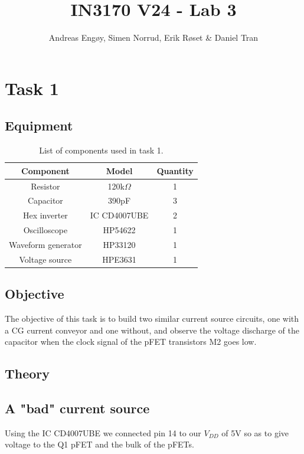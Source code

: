 \documentclass[onecolumn]{article}
\title{IN3170 V24 - Lab 3}
\author{Andreas Engøy, Simen Norrud, Erik Røset \& Daniel Tran}
\date{\monthname[\the\month] \the\year}
\begin{document}
\maketitle


\section{Task 1}
\subsection{Equipment}
\begin{table}[h]
    \centering
    \begin{tabular}{|c|c|c|}
        \hline
        \textbf{Component} & \textbf{Model} & \textbf{Quantity} \\
        \hline
        Resistor & 120k$\Omega$ & 1 \\
        Capacitor & 390pF & 3 \\
        Hex inverter & IC CD4007UBE & 2 \\
        Oscilloscope & HP54622 & 1 \\
        Waveform generator  & HP33120 & 1\\
        Voltage source & HPE3631 & 1 \\
        \hline
    \end{tabular}
    \caption{List of components used in task 1.}
    \label{tab:bom}
\end{table}

\subsection{Objective}
The objective of this task is to build two similar current source circuits, one with a CG current conveyor and one without, and observe the voltage discharge of the capacitor when the clock signal of the pFET transistors M2 goes low.  

\subsection{Theory}

\subsection{A "bad" current source}

Using the IC CD4007UBE we connected pin 14 to our $V_{DD}$ of 5V so as to give voltage to the Q1 pFET and the bulk of the pFETs.
\end{document}
